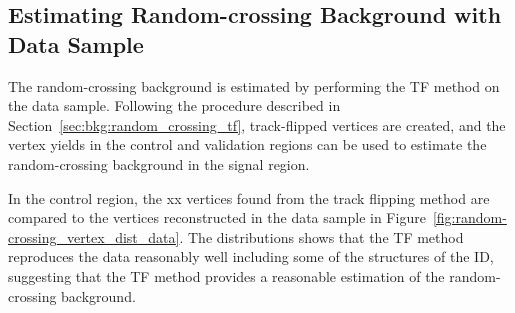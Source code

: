 \subsection{Estimating Random-crossing Background with Data Sample}
\label{sec:bkg:random_crossing_data}

The random-crossing background is estimated by performing the TF method on the data sample. Following the procedure described in Section~\ref{sec:bkg:random_crossing_tf}, track-flipped vertices are created, and the vertex yields in the control and validation regions can be used to estimate the random-crossing background in the signal region.

In the control region, the xx vertices found from the track flipping method are compared to the vertices reconstructed in the data sample in Figure~\ref{fig:random-crossing_vertex_dist_data}. The distributions shows that the TF method reproduces the data reasonably well including some of the structures of the ID, suggesting that the TF method provides a reasonable estimation of the random-crossing background.


